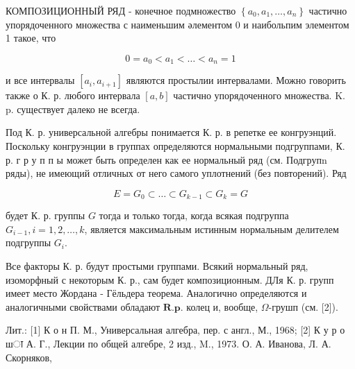 \documentclass[10pt]{article}
\begin{document}
КОМПОЗИЦИОННЫЙ РЯД - конечное подмножество $\left\{a_{0}, a_{1}, \ldots, a_{n}\right\}$ частично упорядоченного множества с наименьшим әлементом 0 и наибольпим элементом 1 такое, что



\[

0=a_{0}<a_{1}<\ldots<a_{n}=1

\]



и все интервалы $\left[a_{i}, a_{i+1}\right]$ являются простылии интервалами. Можно говорить также о К. р. любого интервала $[a, b]$ частично упорядоченного множества. K. p. существует далеко не всегда.



Под К. р. универсальной алгебры понимается К. р. в репетке ее конгруэнций. Поскольку конгруэнции в группах определяются нормальными подгруппами, К. р. г р у п п ы может быть определен как ее нормальный ряд (см. Подгрупn ряды), не имеющий отличных от него самого уплотнений (без повторений). Ряд



\[

E=G_{0} \subset \ldots \subset G_{k-1} \subset G_{k}=G

\]



будет К. р. группы $G$ тогда и только тогда, когда всякая подгруппа $G_{i-1}, i=1,2, \ldots, k$, является максимальным истинным нормальным делителем подгруппы $G_{i}$.



Все факторы К. р. будут простыми группами. Всякий нормальный ряд, изоморфный с некоторым К. р., сам будет композиционным. ДЛя К. р. групп имеет место Жордана - Гёльдера теорема. Аналогично определяются и аналогичными свойствами обладают $\boldsymbol{R} . \mathbf{p}$. колец и, вообще, $\Omega$-грушп (см. [2]).



Лит.: [1] К о н П. М., Универсальная алгебра, пер. с англ., М., 1968; [2] К у р о шा А. Г., Лекции по общей алгебре, 2 изд., M., 1973. О. А. Иванова, Л. А. Скорняков,
\end{document}

